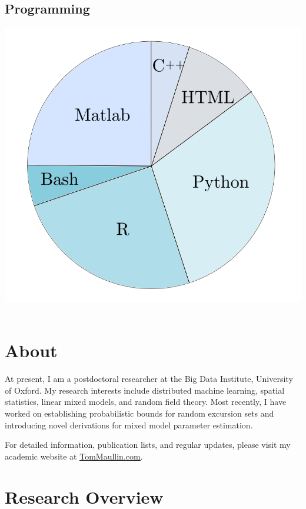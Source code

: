 \documentclass{friggeri-cv}
\begin{document}
\begin{aside}
  \section{\normalsize{Programming}}
    \vspace{2mm}\hspace*{-0.7cm}\includegraphics[scale=0.43]{img/piechart.png}
    ~
\end{aside}
\vspace{0.5cm}
\section{About}

At present, I am a postdoctoral researcher at the Big Data Institute, University of Oxford. My research interests include distributed machine learning, spatial statistics, linear mixed models, and random field theory. Most recently, I have worked on establishing probabilistic bounds for random excursion sets and introducing novel derivations for mixed model parameter estimation. 

For detailed information, publication lists, and regular updates, please visit my academic website at
\underline{\href{https://TomMaullin.com}{TomMaullin.com}}. 
\vspace{0.3cm}

\section{Research Overview}
\end{document}
